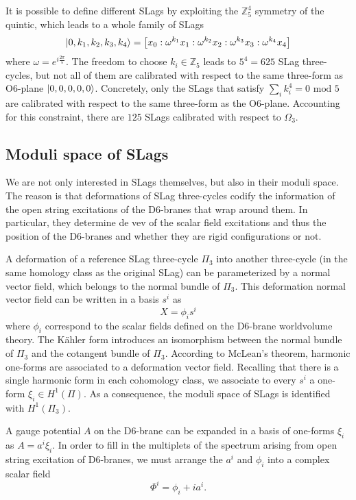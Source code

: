 It is possible to define different SLags by exploiting the $\mathbb Z_5^4$ symmetry of the quintic,
which leads to a whole family of SLags
\begin{equation}
  \ket{0,k_1,k_2,k_3,k_4} = {\qty[x_0:\omega^{k_1} x_1:\omega^{k_2} x_2:\omega^{k_3} x_3:\omega^{k_4} x_4]}
\end{equation}
where $\omega=e^{i\frac{2\pi}{5}}$. 
The freedom to choose $k_i\in \mathbb Z_5$ leads to $5^4=625$ SLag three-cycles, but not all of them are calibrated
with respect to the same three-form as O$6$-plane $\ket{0,0,0,0,0}$.
%
Concretely, only the SLags that satisfy $\sum_{i} k_i^4=0 \text{ mod 5}$ are calibrated with respect to the same three-form as the O$6$-plane.
Accounting for this constraint, there are $125$ SLags calibrated with respect to $\Omega_3$.

\subsection{Moduli space of SLags}

We are not only interested in SLags themselves, but also in their moduli space.
The reason is that deformations of SLag three-cycles codify the information of the open string 
excitations of the D$6$-branes that wrap around them.
In particular, they determine de vev of the scalar field excitations and thus the position of the D6-branes
and whether they are rigid configurations or not.

A deformation of a reference SLag three-cycle $\Pi_3$ into another three-cycle (in the same homology class as the original SLag)  can be parameterized by a normal vector field, which belongs to the normal bundle of $\Pi_3$.  
This deformation normal vector field can be written in a basis $s^i$ as
\begin{equation}
  X=\phi_i s^i
\end{equation}
where $\phi_i$ correspond to the scalar fields defined on the D6-brane worldvolume theory.
The Kähler form introduces an isomorphism between the normal bundle of $\Pi_3$ and the cotangent bundle of $\Pi_3$.
According to McLean's theorem, harmonic one-forms are associated to a deformation vector field.
Recalling that there is a single harmonic form in each cohomology class, we associate to every $s^i$ a one-form $\xi_i\in H^1(\Pi)$.
As a consequence, the moduli space of SLags is identified with $H^1(\Pi_3)$.

A gauge potential $A$ on the D$6$-brane can be expanded in a basis of one-forms $\xi_i$ as $A=a^i \xi_i$.
In order to fill in the multiplets of the spectrum arising from open string excitation of D6-branes,
we must arrange the $a^i$ and $\phi_i$ into a complex scalar field
\begin{equation}
 \Phi^i = \phi_i + ia^i. 
\end{equation}

